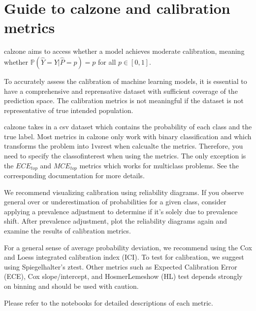 \documentclass[letterpaper,10pt,english]{sphinxmanual}
\let\sphinxpxdimen\pdfpxdimen\else\newdimen\sphinxpxdimen
\begin{document}
\sphinxAtStartPar
\sphinxincludegraphics[width=5580\sphinxpxdimen,height=1400\sphinxpxdimen]{{mytable}.png}


\section{Guide to calzone and calibration metrics}
\label{\detokenize{notebooks/metrics_summary:Guide-to-calzone-and-calibration-metrics}}
\sphinxAtStartPar
calzone aims to access whether a model achieves moderate calibration, meaning whether \(\mathbb{P}(\hat{Y}=Y|\hat{P}=p)=p\) for all \(p\in[0,1]\).

\sphinxAtStartPar
To accurately assess the calibration of machine learning models, it is essential to have a comprehensive and reprensative dataset with sufficient coverage of the prediction space. The calibration metrics is not meaningful if the dataset is not representative of true intended population.

\sphinxAtStartPar
calzone takes in a csv dataset which contains the probability of each class and the true label. Most metrics in calzone only work with binary classification and which transforms the problem into 1\sphinxhyphen{}vs\sphinxhyphen{}rest when calcualte the metrics. Therefore, you need to specify the class\sphinxhyphen{}of\sphinxhyphen{}interest when using the metrics. The only exception is the \(ECE_{top}\) and \(MCE_{top}\) metrics which works for multi\sphinxhyphen{}class problems. See the corresponding documentation for more details.

\sphinxAtStartPar
We recommend visualizing calibration using reliability diagrams. If you observe general over\sphinxhyphen{} or under\sphinxhyphen{}estimation of probabilities for a given class, consider applying a prevalence adjustment to determine if it’s solely due to prevalence shift. After prevalence adjustment, plot the reliability diagrams again and examine the results of calibration metrics.

\sphinxAtStartPar
For a general sense of average probability deviation, we recommend using the Cox and Loess integrated calibration index (ICI). To test for calibration, we suggest using Spiegelhalter’s z\sphinxhyphen{}test. Other metrics such as Expected Calibration Error (ECE), Cox slope/intercept, and Hosmer\sphinxhyphen{}Lemeshow (HL) test depends strongly on binning and should be used with caution.

\sphinxAtStartPar
Please refer to the notebooks for detailed descriptions of each metric.
\end{document}
